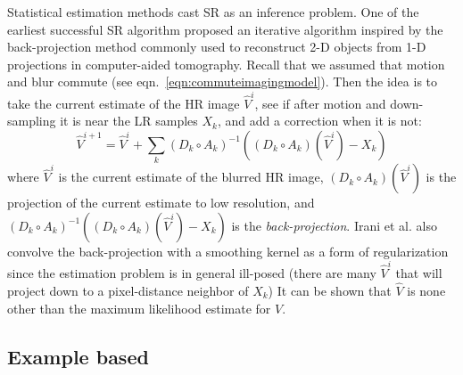 Statistical estimation methods cast SR as an inference problem.
%
One of the earliest successful SR algorithm\cite{Irani1991ImprovingRB} proposed an iterative algorithm inspired by the back-projection method commonly used to reconstruct 2-D objects from 1-D projections in computer-aided tomography.
%
Recall that we assumed that motion and blur commute (see eqn.~\ref{eqn:commuteimagingmodel}).
%
Then the idea is to take the current estimate of the HR image $\hat{V}^{i}$, see if after motion and down-sampling it is near the LR samples $X_k$, and add a correction when it is not:
\begin{equation}
    \hat{V}^{i+1} = \hat{V}^i + \sum_k (D_k \circ A_k)^{-1}\left( (D_k \circ A_k)(\hat{V}^i) - X_k \right)
\end{equation}
where $\hat{V}^i$ is the current estimate of the blurred HR image, $(D_k \circ A_k)(\hat{V}^i)$ is the projection of the current estimate to low resolution, and $(D_k \circ A_k)^{-1}\left( (D_k \circ A_k)(\hat{V}^i) - X_k \right)$ is the \textit{back-projection}.
%
Irani et al.\cite{Irani1991ImprovingRB} also convolve the back-projection with a smoothing kernel as a form of regularization since the estimation problem is in general ill-posed (there are many $\hat{V}^{i}$ that will project down to a pixel-distance neighbor of $X_k$)
%
It can be shown\cite{Elad1996} that $\hat{V}$ is none other than the maximum likelihood estimate for $V$.


%

\subsection{Example based}
